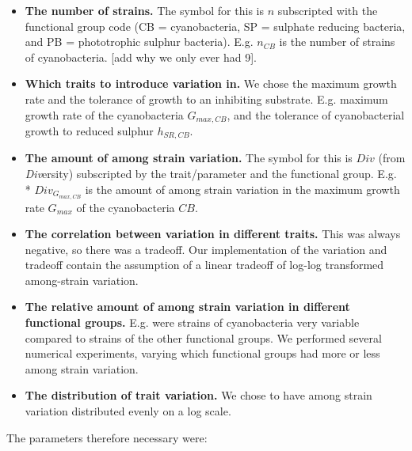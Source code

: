 \documentclass{article}
\begin{document}
\begin{itemize}
\tightlist
\item
  \textbf{The number of strains.} The symbol for this is \(n\)
  subscripted with the functional group code (CB = cyanobacteria, SP =
  sulphate reducing bacteria, and PB = phototrophic sulphur bacteria).
  E.g. \(n_{CB}\) is the number of strains of cyanobacteria. {[}add why
  we only ever had 9{]}.
\item
  \textbf{Which traits to introduce variation in.} We chose the maximum
  growth rate and the tolerance of growth to an inhibiting substrate.
  E.g. maximum growth rate of the cyanobacteria \(G_{max,CB}\), and the
  tolerance of cyanobacterial growth to reduced sulphur \(h_{SR,CB}\).
\item
  \textbf{The amount of among strain variation.} The symbol for this is
  \(Div\) (from \emph{Div}ersity) subscripted by the trait/parameter and
  the functional group. E.g. * \(Div_{G_{max,CB}}\) is the amount of
  among strain variation in the maximum growth rate \(G_{max}\) of the
  cyanobacteria \(CB\).
\item
  \textbf{The correlation between variation in different traits.} This
  was always negative, so there was a tradeoff. Our implementation of
  the variation and tradeoff contain the assumption of a linear tradeoff
  of log-log transformed among-strain variation.
\item
  \textbf{The relative amount of among strain variation in different
  functional groups.} E.g. were strains of cyanobacteria very variable
  compared to strains of the other functional groups. We performed
  several numerical experiments, varying which functional groups had
  more or less among strain variation.
\item
  \textbf{The distribution of trait variation.} We chose to have among
  strain variation distributed evenly on a log scale.
\end{itemize}

The parameters therefore necessary were:
\end{document}
